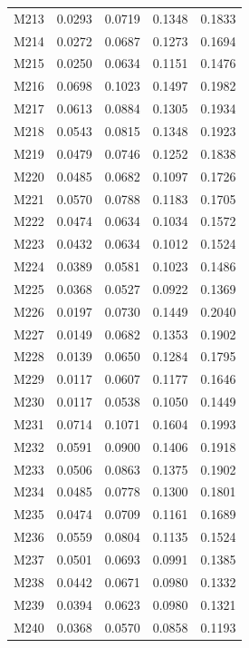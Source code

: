 \begin{longtable}{lrrrr}
M213 & 0.0293 & 0.0719 & 0.1348 & 0.1833 \\
M214 & 0.0272 & 0.0687 & 0.1273 & 0.1694 \\
M215 & 0.0250 & 0.0634 & 0.1151 & 0.1476 \\
M216 & 0.0698 & 0.1023 & 0.1497 & 0.1982 \\
M217 & 0.0613 & 0.0884 & 0.1305 & 0.1934 \\
M218 & 0.0543 & 0.0815 & 0.1348 & 0.1923 \\
M219 & 0.0479 & 0.0746 & 0.1252 & 0.1838 \\
M220 & 0.0485 & 0.0682 & 0.1097 & 0.1726 \\
M221 & 0.0570 & 0.0788 & 0.1183 & 0.1705 \\
M222 & 0.0474 & 0.0634 & 0.1034 & 0.1572 \\
M223 & 0.0432 & 0.0634 & 0.1012 & 0.1524 \\
M224 & 0.0389 & 0.0581 & 0.1023 & 0.1486 \\
M225 & 0.0368 & 0.0527 & 0.0922 & 0.1369 \\
M226 & 0.0197 & 0.0730 & 0.1449 & 0.2040 \\
M227 & 0.0149 & 0.0682 & 0.1353 & 0.1902 \\
M228 & 0.0139 & 0.0650 & 0.1284 & 0.1795 \\
M229 & 0.0117 & 0.0607 & 0.1177 & 0.1646 \\
M230 & 0.0117 & 0.0538 & 0.1050 & 0.1449 \\
M231 & 0.0714 & 0.1071 & 0.1604 & 0.1993 \\
M232 & 0.0591 & 0.0900 & 0.1406 & 0.1918 \\
M233 & 0.0506 & 0.0863 & 0.1375 & 0.1902 \\
M234 & 0.0485 & 0.0778 & 0.1300 & 0.1801 \\
M235 & 0.0474 & 0.0709 & 0.1161 & 0.1689 \\
M236 & 0.0559 & 0.0804 & 0.1135 & 0.1524 \\
M237 & 0.0501 & 0.0693 & 0.0991 & 0.1385 \\
M238 & 0.0442 & 0.0671 & 0.0980 & 0.1332 \\
M239 & 0.0394 & 0.0623 & 0.0980 & 0.1321 \\
M240 & 0.0368 & 0.0570 & 0.0858 & 0.1193 \\
\end{longtable}
